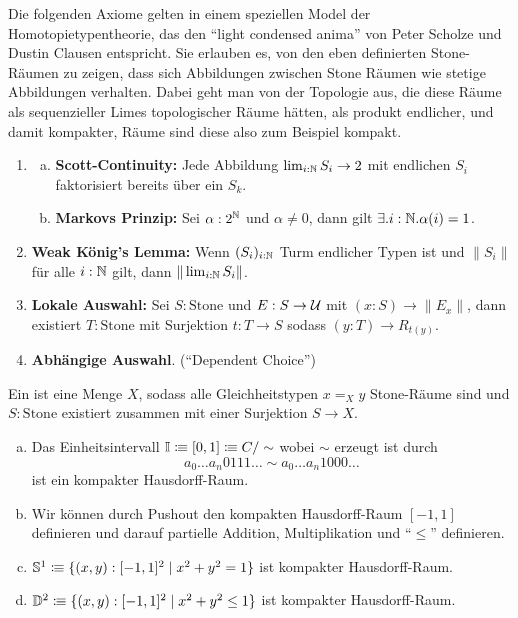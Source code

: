 Die folgenden Axiome gelten in einem speziellen Model der Homotopietypentheorie, das den ``light condensed anima'' von Peter Scholze und Dustin Clausen entspricht.
Sie erlauben es, von den eben definierten Stone-Räumen zu zeigen, dass sich Abbildungen zwischen Stone Räumen wie stetige Abbildungen verhalten. Dabei geht man von der Topologie aus, die diese Räume als sequenzieller Limes topologischer Räume hätten, als produkt endlicher, und damit kompakter, Räume sind diese also zum Beispiel kompakt.

\begin{axiom}
  \begin{enumerate}[(1)]
  \item \begin{enumerate}[(a)]
    \item \textbf{Scott-Continuity:} Jede Abbildung \(\lim_{i:\mathbb{N}}S_i\to 2\) mit endlichen \(S_i\) faktorisiert bereits über ein \(S_k\).
    \item \textbf{Markovs Prinzip:} Sei \(\alpha:2^{\mathbb{N}}\) und \(\alpha\neq 0\), dann gilt \(\exists.i:\mathbb{N}.\alpha(i)=1\).
    \end{enumerate}
  \item \textbf{Weak König's Lemma:} Wenn \((S_i)_{i:\mathbb{N}}\) Turm endlicher Typen ist und \(\|S_i\|\) für alle \(i:\mathbb{N}\) gilt, dann \(\|\lim_{i:\mathbb{N}}S_i\|\).
  \item \textbf{Lokale Auswahl:} Sei \(S:\mathrm{Stone}\) und \(E:S\to\mathcal{U}\) mit
    \((x:S)\to \|E_x\|\), dann existiert \(T:\mathrm{Stone}\) mit Surjektion \(t:T\to S\) sodass \((y:T)\to R_{t(y)}\).
  \item \textbf{Abhängige Auswahl}. (``Dependent Choice'')
  \end{enumerate}
\end{axiom}

\begin{definition}
  Ein  ist eine Menge \(X\), sodass alle Gleichheitstypen \(x=_Xy\) Stone-Räume sind und \(S:\mathrm{Stone}\) existiert zusammen mit einer Surjektion \(S\to X\). 
\end{definition}

\begin{beispiel}
  \begin{enumerate}[(a)]
  \item Das Einheitsintervall \(\mathbb{I}\vcentcolon\mspace{-1.2mu}\equiv [0,1] \vcentcolon\mspace{-1.2mu}\equiv C/\sim\) wobei \(\sim\) erzeugt ist durch
    \[
    a_0\dots a_n0111\dots \sim a_0\dots a_n1000\dots
    \]
    ist ein kompakter Hausdorff-Raum.
  \item Wir können durch Pushout den kompakten Hausdorff-Raum \([-1,1]\) definieren und darauf partielle Addition, Multiplikation und ``\(\leq\)'' definieren.
  \item \(\mathbb{S}^1\vcentcolon\mspace{-1.2mu}\equiv \{(x,y):[-1,1]^2\mid x^2+y^2=1\} \) ist kompakter Hausdorff-Raum.
  \item \(\mathbb{D}^2\vcentcolon\mspace{-1.2mu}\equiv \{(x,y):[-1,1]^2\mid x^2+y^2\leq 1\}\) ist kompakter Hausdorff-Raum.
  \end{enumerate}
\end{beispiel}

